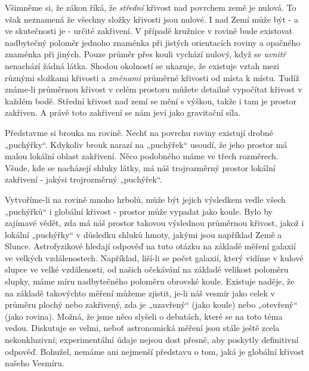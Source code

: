 {    Všimněme si, že zákon říká, že \emph{střední} křivost nad povrchem země je nulová. To však 
    neznamená že všechny složky křivosti jsou nulové. I nad Zemí může být - a ve skutečnosti je - 
    určité zakřivení. V případě kružnice v rovině bude existovat nadbytečný poloměr jednoho 
    znaménka při jistých orientacích roviny a opačného znaménka při jiných. Pouze průměr přes kouli 
    vychází nulový, když se \emph{uvnitř} nenachází žádná látka. Shodou okolností se ukazuje, že 
    existuje vztah mezi různými složkami křivosti a \emph{změnami} průměrné křivosti od místa k 
    místu. Tudíž známe-li průměrnou křivost v celém prostoru můžete detailně vypočítat křivost v 
    každém bodě. Střední křivost nad zemí se mění s výškou, takže i tam je prostor zakřiven. A 
    právě toto zakřivení se nám jeví jako gravitační síla. 
    
    Představme si brouka na rovině. Nechť na povrchu roviny existují drobné „puchýřky“. Kdykoliv 
    brouk narazí na „puchýřek“ usoudí, že jeho prostor má malou lokální oblast zakřivení. Něco 
    podobného máme ve třech rozměrech. Všude, kde se nacházejí shluky látky, má náš trojrozměrný 
    prostor lokální zakřivení - jakýsi trojrozměrný „puchýřek“. 
    
    Vytvoříme-li na rovině mnoho hrbolů, může být jejich výsledkem vedle všech „puchýřků“ i 
    globální křivost - prostor může vypadat jako koule. Bylo by zajímavé vědět, zda má náš prostor 
    takovou výslednou průměrnou křivost, jakož i lokální „puchýřky“ v důsledku shluků hmoty, jakými 
    jsou například Země a Slunce. Astrofyzikové hledají odpověď na tuto otázku na základě měření 
    galaxií ve velkých vzdálenostech. Například, liší-li se počet galaxií, který vidíme v kulové 
    slupce ve velké vzdálenosti, od našich očekávání na základě velikost poloměru slupky, máme míru 
    nadbytečného poloměru obrovské koule. Existuje naděje, že na základě takovýchto měření můžeme 
    zjistit, je-li náš vesmír jako celek v průměru plochý nebo zakřivený, zda je „uzavřený“ (jako 
    koule) nebo „otevřený“ (jako rovina). Možná, že jsme něco slyšeli o debatách, které se na toto 
    téma vedou. Diskutuje se velmi, neboť astronomická měření jsou stále ještě zcela nekonkluzivní; 
    experimentální údaje nejsou dost přesné, aby poskytly definitivní odpověď. Bohužel, nemáme ani 
    nejmenší představu o tom, jaká je globální křivost našeho Vesmíru.
    
}
